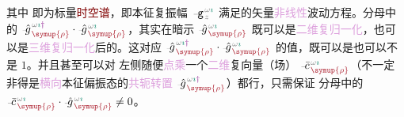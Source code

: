 其中  即为标量\textcolor{Maroon}{时空谱}，即\textcolor{PineGreen}{本征复振幅} $\xint{\begin{smallmatrix} ~ \\ {}^{}_{\mathcolor{gray}{-}} \\ ~ \end{smallmatrix}}{09}{\mathtt{g}}^{\;\!\mathcolor{gray}{\omega} \textcolor{PineGreen}{\imath}}_{\;\! \mathcolor{gray}{z}}$ 满足的矢量\textcolor{Plum}{非线性}波动方程。分母中的 $\xint{{}^{}_{\mathcolor{gray}{-}}}{10}{\hat{g}}^{\;\!\mathcolor{gray}{\omega} \textcolor{PineGreen}{\imath} \textcolor{Plum}{\dag}}_{\;\! \textcolor{Maroon}{\symup{\rho}}} \cdot \xint{{}^{}_{\mathcolor{gray}{-}}}{10}{\hat{g}}^{\;\!\mathcolor{gray}{\omega} \textcolor{PineGreen}{\imath}}_{\;\! \textcolor{Maroon}{\symup{\rho}}}$，其实在暗示 $\xint{{}^{}_{\mathcolor{gray}{-}}}{10}{\hat{g}}^{\;\!\mathcolor{gray}{\omega} \textcolor{PineGreen}{\imath}}_{\;\! \textcolor{Maroon}{\symup{\rho}}}$ 既可以是\textcolor{Plum}{二维复归一化}，也可以是\textcolor{Plum}{三维复归一化}后的。这对应 $\xint{{}^{}_{\mathcolor{gray}{-}}}{10}{\hat{g}}^{\;\!\mathcolor{gray}{\omega} \textcolor{PineGreen}{\imath} \textcolor{Plum}{\dag}}_{\;\! \textcolor{Maroon}{\symup{\rho}}} \cdot \xint{{}^{}_{\mathcolor{gray}{-}}}{10}{\hat{g}}^{\;\!\mathcolor{gray}{\omega} \textcolor{PineGreen}{\imath}}_{\;\! \textcolor{Maroon}{\symup{\rho}}}$ 的值，既可以是也可以不是 $1$。并且甚至可以对  左侧随便\textcolor{Plum}{点乘}一个\textcolor{Plum}{二维}复向量（场） $\xint{{}^{}_{\mathcolor{gray}{-}}}{04}{\bar{c}}^{\;\!\mathcolor{gray}{\omega} \textcolor{PineGreen}{\imath}}_{\;\! \textcolor{Maroon}{\symup{\rho}}}$（不一定非得是\textcolor{Plum}{横向}\textcolor{PineGreen}{本征偏振态}的\textcolor{Plum}{共轭转置} $\xint{{}^{}_{\mathcolor{gray}{-}}}{10}{\hat{g}}^{\;\!\mathcolor{gray}{\omega} \textcolor{PineGreen}{\imath} \textcolor{Plum}{\dag}}_{\;\! \textcolor{Maroon}{\symup{\rho}}}$）都行，只需保证  分母中的 $\xint{{}^{}_{\mathcolor{gray}{-}}}{04}{\bar{c}}^{\;\!\mathcolor{gray}{\omega} \textcolor{PineGreen}{\imath}}_{\;\! \textcolor{Maroon}{\symup{\rho}}} \cdot \xint{{}^{}_{\mathcolor{gray}{-}}}{10}{\hat{g}}^{\;\!\mathcolor{gray}{\omega} \textcolor{PineGreen}{\imath}}_{\;\! \textcolor{Maroon}{\symup{\rho}}} \neq 0$。

